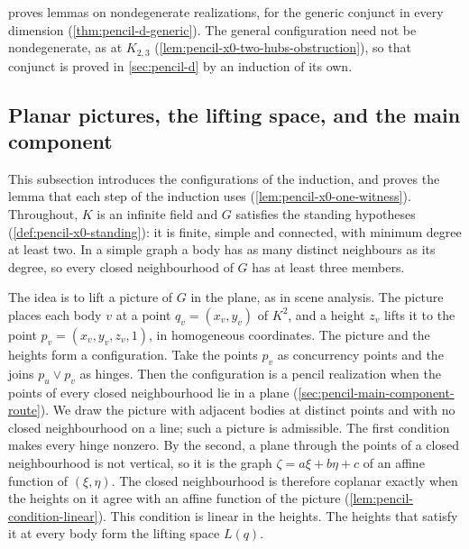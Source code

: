  proves lemmas on nondegenerate
realizations, for the generic conjunct in every dimension
(\cref{thm:pencil-d-generic}). The general
configuration need not be nondegenerate, as at $K_{2,3}$
(\cref{lem:pencil-x0-two-hubs-obstruction}), so that conjunct is proved
in \cref{sec:pencil-d} by an induction of its own.

\subsection{Planar pictures, the lifting space, and the main component}
\label{sec:main-component-carrier}

This subsection introduces the configurations of the induction, and
proves the lemma that each step of the induction uses
(\cref{lem:pencil-x0-one-witness}). Throughout, $K$ is an infinite field
and $G$ satisfies the standing hypotheses
(\cref{def:pencil-x0-standing}): it is finite, simple and connected, with
minimum degree at least two. In a simple graph a body has as many
distinct neighbours as its degree, so every closed neighbourhood of $G$
has at least three members.

The idea is to lift a picture of $G$ in the plane, as in scene analysis.
The picture places each body $v$ at a point $q_v = (x_v, y_v)$ of $K^2$,
and a height $z_v$ lifts it to the point $p_v = (x_v, y_v, z_v, 1)$, in
homogeneous coordinates. The picture and the heights form a
configuration. Take the points $p_v$ as concurrency points and the joins
$p_u \vee p_v$ as hinges. Then the configuration is a pencil
realization when the points of every closed neighbourhood lie in a plane
(\cref{sec:pencil-main-component-route}). We draw the picture with
adjacent bodies at distinct points and with no closed neighbourhood on a
line; such a picture is admissible. The first condition makes every
hinge nonzero. By the second, a plane through the points of a closed
neighbourhood is not vertical, so it is the graph
$\zeta = a\xi + b\eta + c$ of an affine function of $(\xi, \eta)$. The
closed neighbourhood is therefore coplanar exactly when the heights on it
agree with an affine function of the picture
(\cref{lem:pencil-condition-linear}). This condition is linear in the
heights. The heights that satisfy it at every body form the lifting space
$L(q)$.

